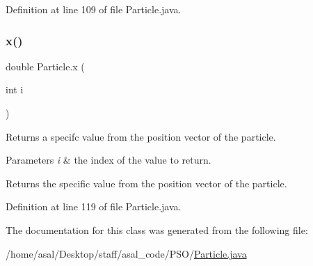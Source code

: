 Definition at line 109 of file Particle.\+java.

\mbox{\label{class_particle_a1298e71228d20427caf49481cd1d0fdf}} 
\subsubsection{\texorpdfstring{x()}{x()}\hspace{0.1cm}{\footnotesize\ttfamily [3/3]}}
{\footnotesize\ttfamily double Particle.\+x (\begin{DoxyParamCaption}\item[{int}]{i }\end{DoxyParamCaption})}

Returns a specifc value from the position vector of the particle. 
\begin{DoxyParams}{Parameters}
{\em i} & the index of the value to return. \\
\hline
\end{DoxyParams}
\begin{DoxyReturn}{Returns}
the specific value from the position vector of the particle. 
\end{DoxyReturn}


Definition at line 119 of file Particle.\+java.



The documentation for this class was generated from the following file\+:\begin{DoxyCompactItemize}
\item 
/home/asal/\+Desktop/staff/asal\+\_\+code/\+P\+S\+O/\hyperlink{_particle_8java}{Particle.\+java}\end{DoxyCompactItemize}
